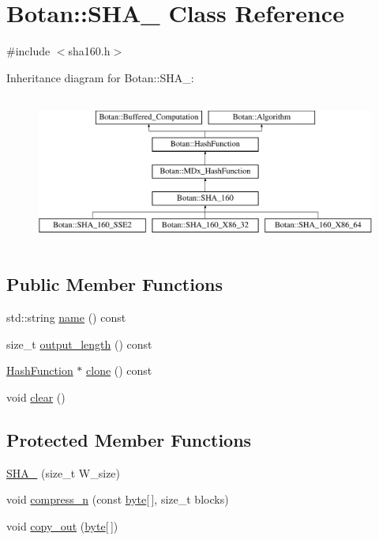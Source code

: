 \hypertarget{classBotan_1_1SHA__160}{\section{Botan\-:\-:S\-H\-A\-\_ Class Reference}
\label{classBotan_1_1SHA__160}
}


{\ttfamily \#include $<$sha160.\-h$>$}

Inheritance diagram for Botan\-:\-:S\-H\-A\-\_\-:\begin{figure}[H]
\begin{center}
\leavevmode
\includegraphics[height=5.000000cm]{classBotan_1_1SHA__160}
\end{center}
\end{figure}
\subsection*{Public Member Functions}
\begin{DoxyCompactItemize}
\item 
std\-::string \hyperlink{classBotan_1_1SHA__160_aef92b3e2dce3e332c411983a1b00bc12}{name} () const 
\item 
size\-\_\-t \hyperlink{classBotan_1_1SHA__160_ab377faaebaea31fea878804c5d640f9f}{output\-\_\-length} () const 
\item 
\hyperlink{classBotan_1_1HashFunction}{Hash\-Function} $\ast$ \hyperlink{classBotan_1_1SHA__160_a7303294d56fb49893385bbf3afe959ef}{clone} () const 
\item 
void \hyperlink{classBotan_1_1SHA__160_a96d3deedc6b26b13e048523ccdc957a2}{clear} ()
\end{DoxyCompactItemize}
\subsection*{Protected Member Functions}
\begin{DoxyCompactItemize}
\item 
\hyperlink{classBotan_1_1SHA__160_a7a2fde8c8908572318d4f47df8f2aac3}{S\-H\-A\-\_} (size\-\_\-t W\-\_\-size)
\item 
void \hyperlink{classBotan_1_1SHA__160_acdc60bfafc2455f5146f0a5c3f20aa83}{compress\-\_\-n} (const \hyperlink{namespaceBotan_a7d793989d801281df48c6b19616b8b84}{byte}\mbox{[}$\,$\mbox{]}, size\-\_\-t blocks)
\item 
void \hyperlink{classBotan_1_1SHA__160_a650b2c5a6f7b8cf1010e414ac9feba89}{copy\-\_\-out} (\hyperlink{namespaceBotan_a7d793989d801281df48c6b19616b8b84}{byte}\mbox{[}$\,$\mbox{]})
\end{DoxyCompactItemize}
